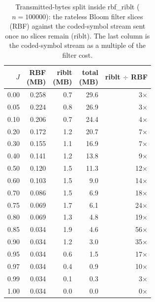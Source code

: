 \begin{table}[t]
    \centering
    \caption{Transmitted-bytes split inside rbf\_riblt ($n=100000$): the rateless Bloom filter slices (RBF) against the coded-symbol stream sent once no slices remain (riblt). The last column is the coded-symbol stream as a multiple of the filter cost.}
    \label{tab:bytes-saving}
    \begin{tabular}{rrrrr}
      \toprule
      $J$ & \makecell{RBF\\(MB)} & \makecell{riblt\\(MB)} & \makecell{total\\(MB)} & \makecell{riblt\\$\div$ RBF} \\
      \midrule
      0.00 & 0.258 & 0.7 & 29.6 & 3$\times$ \\
      0.05 & 0.224 & 0.8 & 26.9 & 3$\times$ \\
      0.10 & 0.206 & 0.7 & 24.4 & 4$\times$ \\
      0.20 & 0.172 & 1.2 & 20.7 & 7$\times$ \\
      0.30 & 0.155 & 1.1 & 16.9 & 7$\times$ \\
      0.40 & 0.141 & 1.2 & 13.8 & 9$\times$ \\
      0.50 & 0.120 & 1.5 & 11.3 & 12$\times$ \\
      0.60 & 0.103 & 1.5 & 9.0 & 14$\times$ \\
      0.70 & 0.086 & 1.5 & 6.9 & 18$\times$ \\
      0.75 & 0.069 & 1.7 & 6.1 & 24$\times$ \\
      0.80 & 0.069 & 1.3 & 4.8 & 19$\times$ \\
      0.85 & 0.034 & 1.9 & 4.6 & 56$\times$ \\
      0.90 & 0.034 & 1.2 & 3.0 & 35$\times$ \\
      0.95 & 0.034 & 0.6 & 1.5 & 17$\times$ \\
      0.97 & 0.034 & 0.4 & 0.9 & 10$\times$ \\
      0.99 & 0.034 & 0.1 & 0.3 & 3$\times$ \\
      1.00 & 0.034 & 0.0 & 0.0 & 0$\times$ \\
      \bottomrule
    \end{tabular}
\end{table}
